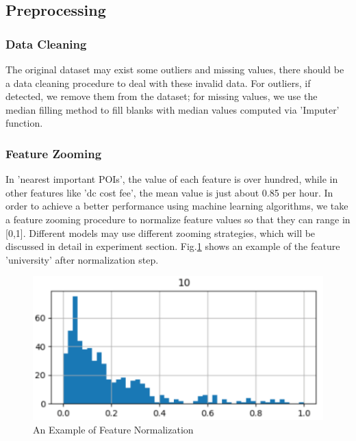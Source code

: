 \subsection{Preprocessing}
\subsubsection{Data Cleaning}
The original dataset may exist some outliers and missing values, there should be a data cleaning procedure to deal with these invalid data. For outliers, if detected, we remove them from the dataset; for missing values, we use the median filling method to fill blanks with median values computed via 'Imputer' function.

\subsubsection{Feature Zooming}
In 'nearest important POIs', the value of each feature is over hundred, while in other features like 'dc cost fee', the mean value is just about 0.85 per hour. In order to achieve a better performance using machine learning algorithms, we take a feature zooming procedure to normalize feature values so that they can range in [0,1]. Different models may use different zooming strategies, which will be discussed in detail in experiment section. Fig.\ref{fig8} shows an example of the feature 'university' after normalization step.
\begin{figure}[!htp]
	\includegraphics[width=\columnwidth]{./figures/uni.pdf}
	\centering
	\caption{An Example of Feature Normalization}
	\label{fig8}
\end{figure}
